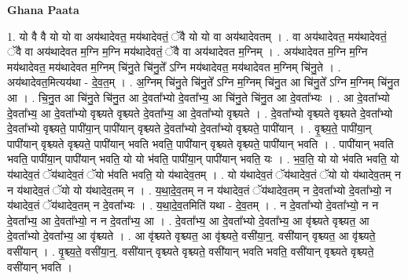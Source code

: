 \documentclass[17pt]{extarticle}
\begin{document}
\textbf{Ghana Paata } \newline

1. यो वै वै यो यो वा अय॑थादेवत॒ मय॑थादेवतं॒ ॅवै यो यो वा अय॑थादेवतम् । . वा अय॑थादेवत॒ मय॑थादेवतं॒ ॅवै वा अय॑थादेवत म॒ग्नि म॒ग्नि मय॑थादेवतं॒ ॅवै वा अय॑थादेवत म॒ग्निम् । . अय॑थादेवत म॒ग्नि म॒ग्नि मय॑थादेवत॒ मय॑थादेवत म॒ग्निम् चि॑नु॒ते चि॑नु॒ते᳚ ऽग्नि मय॑थादेवत॒ मय॑थादेवत म॒ग्निम् चि॑नु॒ते । . अय॑थादेवत॒मित्यय॑था - दे॒व॒त॒म् । . अ॒ग्निम् चि॑नु॒ते चि॑नु॒ते᳚ ऽग्नि म॒ग्निम् चि॑नु॒त आ चि॑नु॒ते᳚ ऽग्नि म॒ग्निम् चि॑नु॒त आ । . चि॒नु॒त आ चि॑नु॒ते चि॑नु॒त आ दे॒वता᳚भ्यो दे॒वता᳚भ्य॒ आ चि॑नु॒ते चि॑नु॒त आ दे॒वता᳚भ्यः । . आ दे॒वता᳚भ्यो दे॒वता᳚भ्य॒ आ दे॒वता᳚भ्यो वृश्च्यते वृश्च्यते दे॒वता᳚भ्य॒ आ दे॒वता᳚भ्यो वृश्च्यते । . दे॒वता᳚भ्यो वृश्च्यते वृश्च्यते दे॒वता᳚भ्यो दे॒वता᳚भ्यो वृश्च्यते॒ पापी॑या॒न् पापी॑यान् वृश्च्यते दे॒वता᳚भ्यो दे॒वता᳚भ्यो वृश्च्यते॒ पापी॑यान् । . वृ॒श्च्य॒ते॒ पापी॑या॒न् पापी॑यान् वृश्च्यते वृश्च्यते॒ पापी॑यान् भवति भवति॒ पापी॑यान् वृश्च्यते वृश्च्यते॒ पापी॑यान् भवति । . पापी॑यान् भवति भवति॒ पापी॑या॒न् पापी॑यान् भवति॒ यो यो भ॑वति॒ पापी॑या॒न् पापी॑यान् भवति॒ यः । . भ॒व॒ति॒ यो यो भ॑वति भवति॒ यो य॑थादेव॒तं ॅय॑थादेव॒तं ॅयो भ॑वति भवति॒ यो य॑थादेव॒तम् । . यो य॑थादेव॒तं ॅय॑थादेव॒तं ॅयो यो य॑थादेव॒तम् न न य॑थादेव॒तं ॅयो यो य॑थादेव॒तम् न । . य॒था॒दे॒व॒तम् न न य॑थादेव॒तं ॅय॑थादेव॒तम् न दे॒वता᳚भ्यो दे॒वता᳚भ्यो॒ न य॑थादेव॒तं ॅय॑थादेव॒तम् न दे॒वता᳚भ्यः । . य॒था॒दे॒व॒तमिति॑ यथा - दे॒व॒तम् । . न दे॒वता᳚भ्यो दे॒वता᳚भ्यो॒ न न दे॒वता᳚भ्य॒ आ दे॒वता᳚भ्यो॒ न न दे॒वता᳚भ्य॒ आ । . दे॒वता᳚भ्य॒ आ दे॒वता᳚भ्यो दे॒वता᳚भ्य॒ आ वृ॑श्च्यते वृश्च्यत॒ आ दे॒वता᳚भ्यो दे॒वता᳚भ्य॒ आ वृ॑श्च्यते । . आ वृ॑श्च्यते वृश्च्यत॒ आ वृ॑श्च्यते॒ वसी॑या॒न्॒. वसी॑यान् वृश्च्यत॒ आ वृ॑श्च्यते॒ वसी॑यान् । . वृ॒श्च्य॒ते॒ वसी॑या॒न्॒. वसी॑यान् वृश्च्यते वृश्च्यते॒ वसी॑यान् भवति भवति॒ वसी॑यान् वृश्च्यते वृश्च्यते॒ वसी॑यान् भवति । \newline
\end{document}
